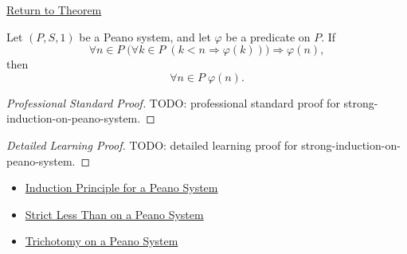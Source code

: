 \newpage
{}
\label{prf:strong-induction-on-peano-system}

\begin{remark*}[Return]
\hyperref[thm:strong-induction-on-peano-system]{Return to Theorem}
\end{remark*}

\begin{theorem*}
Let $(P,S,1)$ be a Peano system, and let $\varphi$ be a predicate on $P$.
If
\[
\forall n \in P\;
\bigl(\forall k \in P\;(k < n \Longrightarrow \varphi(k))\bigr)
\Longrightarrow \varphi(n),
\]
then
\[
\forall n \in P\;\varphi(n).
\]
\end{theorem*}

\begin{proof}[Professional Standard Proof]
\LRAProofBodyStart
TODO: professional standard proof for strong-induction-on-peano-system.
\end{proof}

\begin{proof}[Detailed Learning Proof]
\LRAProofBodyStart
TODO: detailed learning proof for strong-induction-on-peano-system.
\end{proof}

\begin{remark*}
\end{remark*}

\begin{dependencies}
\begin{itemize}
  \item \hyperref[thm:induction-principle-for-peano-system]{Induction Principle for a Peano System}
  \item \hyperref[def:strict-less-than-on-peano-system]{Strict Less Than on a Peano System}
  \item \hyperref[thm:trichotomy-on-peano-system]{Trichotomy on a Peano System}
\end{itemize}
\end{dependencies}

\clearpage
